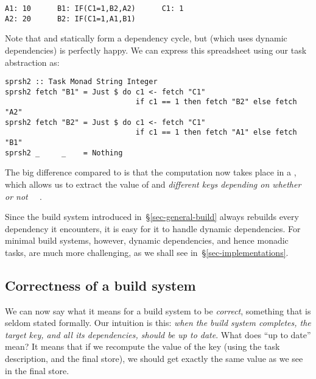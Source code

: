 \vspace{1mm}
\begin{verbatim}
A1: 10      B1: IF(C1=1,B2,A2)      C1: 1
A2: 20      B2: IF(C1=1,A1,B1)
\end{verbatim}

\noindent
Note that  and  statically form a dependency cycle, but \Excel (which
uses dynamic dependencies) is perfectly happy. We can express this spreadsheet
using our task abstraction as:


\vspace{1mm}
\begin{verbatim}
sprsh2 :: Task Monad String Integer
sprsh2 fetch "B1" = Just $ do c1 <- fetch "C1"
                              if c1 == 1 then fetch "B2" else fetch "A2"
sprsh2 fetch "B2" = Just $ do c1 <- fetch "C1"
                              if c1 == 1 then fetch "A1" else fetch "B1"
sprsh2 _     _    = Nothing
\end{verbatim}
\vspace{1mm}

\noindent
The big difference compared to  is that the computation now takes
place in a , which allows us to extract the value of  and
 \emph{different keys depending on whether or not ~\hs{==}~}.

Since the  build system introduced in~\S\ref{sec-general-build} always
rebuilds every dependency it encounters, it is easy for it to handle dynamic
dependencies. For minimal build systems, however, dynamic dependencies, and hence
monadic tasks, are much more challenging, as we shall see
in~\S\ref{sec-implementations}.

\subsection{Correctness of a build system} \label{sec-build-correctness}

We can now say what it means for a build system to be \emph{correct}, something
that is seldom stated formally. Our intuition is this: \emph{when the build
system completes, the target key, and all its dependencies, should be up to
date}. What does ``up to date'' mean? It means that if we recompute the value of
the key (using the task description, and the final store), we should get exactly
the same value as we see in the final store.

